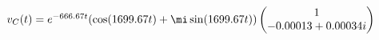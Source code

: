 \documentclass[preview]{standalone}
\begin{document}
\begin{center}
$v_C(t) = e^{-666.67t}( \cos(1699.67t) +\mi \sin(1699.67t)) \begin{pmatrix} 1 \\ -0.00013 + 0.00034i \end{pmatrix}$
\end{center}
\end{document}
